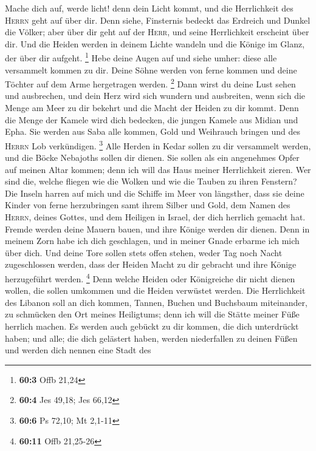  Mache dich auf, werde licht! denn dein Licht kommt, und
die Herrlichkeit des \textsc{Herrn} geht auf über dir. 
Denn siehe, Finsternis bedeckt das Erdreich und Dunkel die Völker; aber
über dir geht auf der \textsc{Herr}, und seine Herrlichkeit erscheint
über dir.  Und die Heiden werden in deinem Lichte wandeln
und die Könige im Glanz, der über dir aufgeht. \footnote{\textbf{60:3}
  Offb 21,24}  Hebe deine Augen auf und siehe umher: diese
alle versammelt kommen zu dir. Deine Söhne werden von ferne kommen und
deine Töchter auf dem Arme hergetragen werden. \footnote{\textbf{60:4}
  Jes 49,18; Jes 66,12}  Dann wirst du deine Lust sehen
und ausbrechen, und dein Herz wird sich wundern und ausbreiten, wenn
sich die Menge am Meer zu dir bekehrt und die Macht der Heiden zu dir
kommt.  Denn die Menge der Kamele wird dich bedecken, die
jungen Kamele aus Midian und Epha. Sie werden aus Saba alle kommen, Gold
und Weihrauch bringen und des \textsc{Herrn} Lob verkündigen.
\footnote{\textbf{60:6} Ps 72,10; Mt 2,1-11}  Alle Herden
in Kedar sollen zu dir versammelt werden, und die Böcke Nebajoths sollen
dir dienen. Sie sollen als ein angenehmes Opfer auf meinen Altar kommen;
denn ich will das Haus meiner Herrlichkeit zieren.  Wer
sind die, welche fliegen wie die Wolken und wie die Tauben zu ihren
Fenstern?  Die Inseln harren auf mich und die Schiffe im
Meer von längsther, dass sie deine Kinder von ferne herzubringen samt
ihrem Silber und Gold, dem Namen des \textsc{Herrn}, deines Gottes, und
dem Heiligen in Israel, der dich herrlich gemacht hat. 
Fremde werden deine Mauern bauen, und ihre Könige werden dir dienen.
Denn in meinem Zorn habe ich dich geschlagen, und in meiner Gnade
erbarme ich mich über dich.  Und deine Tore sollen stets
offen stehen, weder Tag noch Nacht zugeschlossen werden, dass der Heiden
Macht zu dir gebracht und ihre Könige herzugeführt werden. \footnote{\textbf{60:11}
  Offb 21,25-26}  Denn welche Heiden oder Königreiche dir
nicht dienen wollen, die sollen umkommen und die Heiden verwüstet
werden.  Die Herrlichkeit des Libanon soll an dich
kommen, Tannen, Buchen und Buchsbaum miteinander, zu schmücken den Ort
meines Heiligtums; denn ich will die Stätte meiner Füße herrlich machen.
 Es werden auch gebückt zu dir kommen, die dich
unterdrückt haben; und alle; die dich gelästert haben, werden
niederfallen zu deinen Füßen und werden dich nennen eine Stadt des
